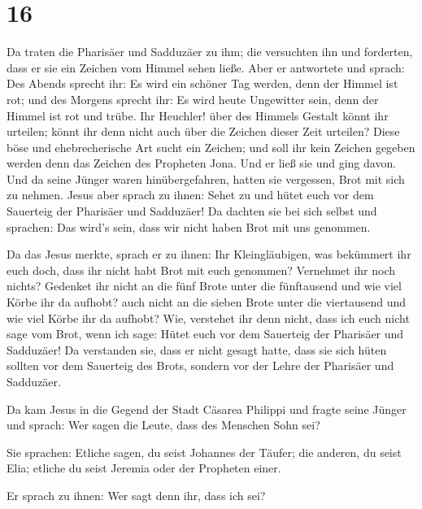 \hypertarget{section-15}{%
\section{16}\label{section-15}}

 Da traten die Pharisäer und Sadduzäer zu ihm; die
versuchten ihn und forderten, dass er sie ein Zeichen vom Himmel sehen
ließe.  Aber er antwortete und sprach: Des Abends sprecht
ihr: Es wird ein schöner Tag werden, denn der Himmel ist rot;
 und des Morgens sprecht ihr: Es wird heute Ungewitter
sein, denn der Himmel ist rot und trübe. Ihr Heuchler! über des Himmels
Gestalt könnt ihr urteilen; könnt ihr denn nicht auch über die Zeichen
dieser Zeit urteilen?  Diese böse und ehebrecherische Art
sucht ein Zeichen; und soll ihr kein Zeichen gegeben werden denn das
Zeichen des Propheten Jona. Und er ließ sie und ging davon.
 Und da seine Jünger waren hinübergefahren, hatten sie
vergessen, Brot mit sich zu nehmen.  Jesus aber sprach zu
ihnen: Sehet zu und hütet euch vor dem Sauerteig der Pharisäer und
Sadduzäer!  Da dachten sie bei sich selbst und sprachen:
Das wird's sein, dass wir nicht haben Brot mit uns genommen.

 Da das Jesus merkte, sprach er zu ihnen: Ihr
Kleingläubigen, was bekümmert ihr euch doch, dass ihr nicht habt Brot
mit euch genommen?  Vernehmet ihr noch nichts? Gedenket
ihr nicht an die fünf Brote unter die fünftausend und wie viel Körbe ihr
da aufhobt?  auch nicht an die sieben Brote unter die
viertausend und wie viel Körbe ihr da aufhobt?  Wie,
verstehet ihr denn nicht, dass ich euch nicht sage vom Brot, wenn ich
sage: Hütet euch vor dem Sauerteig der Pharisäer und Sadduzäer!
 Da verstanden sie, dass er nicht gesagt hatte, dass sie
sich hüten sollten vor dem Sauerteig des Brots, sondern vor der Lehre
der Pharisäer und Sadduzäer.

 Da kam Jesus in die Gegend der Stadt Cäsarea Philippi
und fragte seine Jünger und sprach: Wer sagen die Leute, dass des
Menschen Sohn sei?

 Sie sprachen: Etliche sagen, du seist Johannes der
Täufer; die anderen, du seist Elia; etliche du seist Jeremia oder der
Propheten einer.

 Er sprach zu ihnen: Wer sagt denn ihr, dass ich sei?

